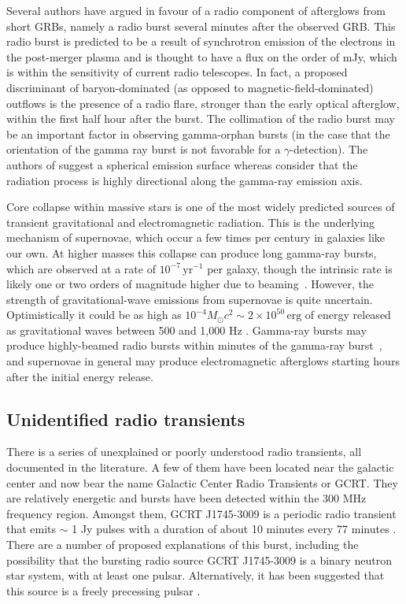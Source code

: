 \documentclass[epsf]{article}
\begin{document}
Several authors \cite{Moortgat:2003jh,Usov:2000yr,nakar07} have argued
in favour of a radio component of afterglows from short GRBs, namely a radio burst several minutes after the
observed GRB.  This radio burst is predicted to be a result of synchrotron emission of the electrons in the post-merger plasma and is thought to have a flux on the order of mJy, which is within the sensitivity of current radio telescopes.  In
fact, a proposed discriminant \cite{nakar07} of baryon-dominated (as
opposed to magnetic-field-dominated) outflows is the presence of a radio
flare, stronger than the early optical afterglow, within the first half
hour after the burst. The collimation of the radio burst may be an important factor in observing gamma-orphan bursts (in the case that the orientation of the gamma ray burst is not favorable for a $\gamma$-detection). The authors of \cite{Hansen:2000am} suggest a spherical emission surface whereas \cite{Moortgat:2003jh,Usov:2000yr} consider that the radiation process is highly directional along the gamma-ray emission axis.


Core collapse within massive stars is one of the most widely predicted sources of
transient gravitational and electromagnetic radiation.  This is the underlying
mechanism of supernovae, which occur a few times per century in galaxies
like our own.  At higher masses this collapse can produce long gamma-ray
bursts, which are observed at a rate of $10^{-7}\,\mathrm{yr}^{-1}$ per
galaxy, though the intrinsic rate is likely one or two orders of
magnitude higher due to beaming~\cite{Sadowski:2007dz}. However, the strength of
gravitational-wave emissions from supernovae is quite uncertain.
Optimistically it could be as high as $10^{-4}M_\odot c^2 \sim 2 \times 10^{50}\,\mathrm{erg}$ of energy
released as gravitational waves between 500 and 1,000 Hz
\cite{ott:201102}. Gamma-ray bursts may produce highly-beamed radio bursts within minutes of the gamma-ray burst~\cite{Usov:2000yr}, and supernovae in
general may produce electromagnetic afterglows starting hours after the
initial energy release.


\subsection{Unidentified radio transients}

There is a series of unexplained or poorly understood radio
transients, all documented in the literature.  A few of them have
been located near the galactic center and now bear the name Galactic
Center Radio Transients or GCRT. They are relatively energetic and
bursts have been detected within the 300 MHz frequency region.
Amongst them, GCRT J1745-3009 is a periodic radio transient that
emits $\sim$ 1 Jy pulses with a duration of about 10 minutes every
77 minutes \cite{hyman}.  There are a number of proposed
explanations of this burst, including \cite{turolla} the possibility
that the bursting radio source GCRT J1745-3009 is a binary neutron
star system, with at least one pulsar.  Alternatively, it has been
suggested that this source is a freely precessing pulsar
\cite{zhu}.   
\end{document}
